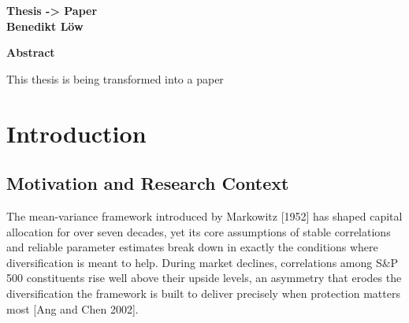 \documentclass[12pt]{article}
\begin{document}
\begin{titlepage}
    \centering
    \textbf{Thesis -> Paper}\vspace{3cm}\\
    \textbf{Benedikt Löw}\\
\end{titlepage}







\newpage
\pagestyle{plain}
\setcounter{page}{2}
\begin{center}
    \textbf{Abstract}
\end{center}

\noindent

This thesis is being transformed into a paper



\newpage
\pagestyle{plain}
\setcounter{page}{1}
\section{Introduction}
\subsection{Motivation and Research Context}
The mean-variance framework introduced by Markowitz [1952] has shaped 
capital allocation for over seven decades, yet its core assumptions of 
stable correlations and reliable parameter estimates break down in exactly 
the conditions where diversification is meant to help. During market declines, 
correlations among S\&P 500 constituents rise well above their upside levels, 
an asymmetry that erodes the diversification the framework is built to deliver 
precisely when protection matters most [Ang and Chen 2002].
\end{document}
